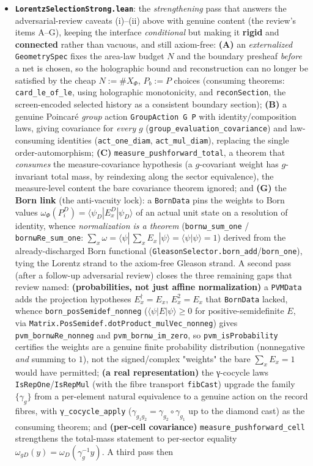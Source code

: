 \documentclass[11pt,a4paper]{article}
\begin{document}
\begin{itemize}
  \item \textbf{\texttt{LorentzSelectionStrong.lean}}: the \emph{strengthening} pass that answers the adversarial-review caveats (i)–(ii) above with genuine content (the review's items A–G), keeping the interface \emph{conditional} but making it \textbf{rigid} and \textbf{connected} rather than vacuous, and still axiom-free: \textbf{(A)} an \emph{externalized} \texttt{GeometrySpec} fixes the area-law budget $N$ and the boundary presheaf \emph{before} a net is chosen, so the holographic bound and reconstruction can no longer be satisfied by the cheap $N:=\#X_\Phi$, $P_b:=P$ choices (consuming theorems: \texttt{card\_le\_of\_le}, using holographic monotonicity, and \texttt{reconSection}, the screen-encoded selected history as a consistent boundary section); \textbf{(B)} a genuine Poincaré \emph{group} action \texttt{GroupAction G P} with identity/composition laws, giving covariance for \emph{every} $g$ (\texttt{group\_evaluation\_covariance}) and law-consuming identities (\texttt{act\_one\_diam}, \texttt{act\_mul\_diam}), replacing the single order-automorphism; \textbf{(C)} \texttt{measure\_pushforward\_total}, a theorem that \emph{consumes} the measure-covariance hypothesis (a $g$-covariant weight has $g$-invariant total mass, by reindexing along the sector equivalence), the measure-level content the bare covariance theorem ignored; and \textbf{(G)} the \textbf{Born link} (the anti-vacuity lock): a \texttt{BornData} pins the weights to Born values $\omega_\Phi(P_i^D)=\langle\psi_D|E_x^D|\psi_D\rangle$ of an actual unit state on a resolution of identity, whence \emph{normalization is a theorem} (\texttt{bornω\_sum\_one} / \texttt{bornωRe\_sum\_one}: $\sum_x\omega = \langle\psi|\,{\textstyle\sum_x}E_x\,|\psi\rangle = \langle\psi|\psi\rangle = 1$) derived from the already-discharged Born functional (\texttt{GleasonSelector.born\_add}/\texttt{born\_one}), tying the Lorentz strand to the axiom-free Gleason strand. A second pass (after a follow-up adversarial review) closes the three remaining gaps that review named: \textbf{(probabilities, not just affine normalization)} a \texttt{PVMData} adds the projection hypotheses $E_x^\dagger=E_x$, $E_x^2=E_x$ that \texttt{BornData} lacked, whence \texttt{born\_posSemidef\_nonneg} ($\langle\psi|E|\psi\rangle\ge 0$ for positive-semidefinite $E$, via \texttt{Matrix.PosSemidef.dotProduct\_mulVec\_nonneg}) gives \texttt{pvm\_bornωRe\_nonneg} and \texttt{pvm\_bornω\_im\_zero}, so \texttt{pvm\_isProbability} certifies the weights are a genuine finite probability distribution (nonnegative \emph{and} summing to $1$), not the signed/complex "weights" the bare $\sum_x E_x=1$ would have permitted; \textbf{(a real representation)} the γ-cocycle laws \texttt{IsRepOne}/\texttt{IsRepMul} (with the fibre transport \texttt{fibCast}) upgrade the family $\{\gamma_g\}$ from a per-element natural equivalence to a genuine action on the record fibres, with \texttt{γ\_cocycle\_apply} ($\gamma_{g_1 g_2}=\gamma_{g_2}\circ\gamma_{g_1}$ up to the diamond cast) as the consuming theorem; and \textbf{(per-cell covariance)} \texttt{measure\_pushforward\_cell} strengthens the total-mass statement to per-sector equality $\omega_{gD}(y)=\omega_D(\gamma_g^{-1}y)$. A third pass then 
\end{itemize}
\end{document}
